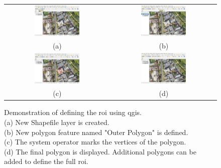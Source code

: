 \begin{figure}[h]
    \centering
    \begin{tabular}{cc}
        \includegraphics[width=0.45\textwidth]{figs/Jihwan/qgis_a.png} &
        \includegraphics[width=0.45\textwidth]{figs/Jihwan/qgis_b.png} \\
        (a) & (b) \\[10pt]
        \includegraphics[width=0.45\textwidth]{figs/Jihwan/qgis_c.png} &
        \includegraphics[width=0.45\textwidth]{figs/Jihwan/qgis_d.png} \\
        (c) & (d)
    \end{tabular}
    \caption[Demonstration of \gls{roi} Definition using \gls{qgis}]
    {Demonstration of defining the \gls{roi} using \gls{qgis}. \\
    (a) New Shapefile layer is created. \\
    (b) New polygon feature named "Outer Polygon" is defined. \\
    (c) The system operator marks the vertices of the polygon. \\
    (d) The final polygon is displayed. Additional polygons can be added to define the full \gls{roi}.}
    \label{fig:msp_qgis}
\end{figure}

